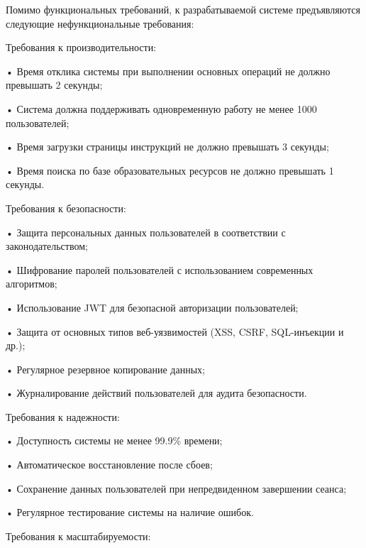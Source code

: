 {\gostFont

  \par \redline Помимо функциональных требований, к разрабатываемой системе предъявляются следующие нефункциональные требования:

  \par \redline Требования к производительности:

  \par \redline • Время отклика системы при выполнении основных операций не должно превышать 2 секунды;
  \par \redline • Система должна поддерживать одновременную работу не менее 1000 пользователей;
  \par \redline • Время загрузки страницы инструкций не должно превышать 3 секунды;
  \par \redline • Время поиска по базе образовательных ресурсов не должно превышать 1 секунды.

  \par \redline Требования к безопасности:

  \par \redline • Защита персональных данных пользователей в соответствии с законодательством;
  \par \redline • Шифрование паролей пользователей с использованием современных алгоритмов;
  \par \redline • Использование JWT для безопасной авторизации пользователей;
  \par \redline • Защита от основных типов веб-уязвимостей (XSS, CSRF, SQL-инъекции и др.);
  \par \redline • Регулярное резервное копирование данных;
  \par \redline • Журналирование действий пользователей для аудита безопасности.

  \par \redline Требования к надежности:

  \par \redline • Доступность системы не менее 99.9\% времени;
  \par \redline • Автоматическое восстановление после сбоев;
  \par \redline • Сохранение данных пользователей при непредвиденном завершении сеанса;
  \par \redline • Регулярное тестирование системы на наличие ошибок.

  \par \redline Требования к масштабируемости:

}
